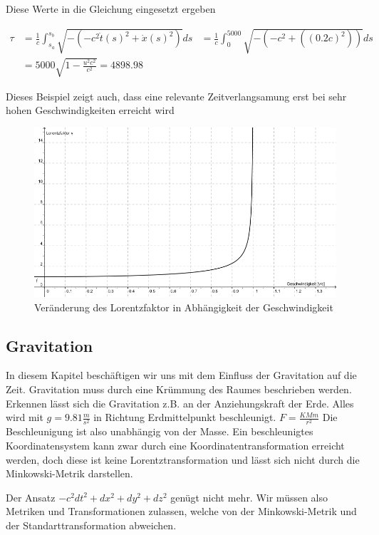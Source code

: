 \begin{refsection}
	
	Diese Werte in die Gleichung eingesetzt ergeben

\begin{align*}
    \tau
    &=
    \frac{1}{c}\int_{s_{a}}^{s_{b}}\sqrt{-(-c^2\dot{t}(s)^2+\dot{x}(s)^2)}ds
    &=
    \frac{1}{c}\int_{0}^{5000}\sqrt{-(-c^2+((0.2c)^2))}ds\\
    &=
    5000\sqrt{1-\frac{u^2 c^2}{c^2}} = 4898.98
\end{align*}

Dieses Beispiel zeigt auch, dass eine relevante Zeitverlangsamung erst bei sehr hohen Geschwindigkeiten erreicht wird

\begin{figure}
    \centering
    \includegraphics[width=\hsize]{zeitreisen/Lorentzfaktor.jpg}
    \caption{Ver\"anderung des Lorentzfaktor in Abh\"angigkeit der Geschwindigkeit%
        \label{skript:geodaten:fig:transport}}
\end{figure}

\subsection{Gravitation}

	In diesem Kapitel beschäftigen wir uns mit dem Einfluss der Gravitation auf die Zeit. Gravitation muss durch eine Krümmung des Raumes beschrieben werden. Erkennen lässt sich die Gravitation z.B. an der Anziehungskraft der Erde. Alles wird mit $g=9.81\frac{m}{s^2}$ in Richtung Erdmittelpunkt beschleunigt. $F=\frac{KMm}{r^2}$
	Die Beschleunigung ist also unabhängig von der Masse.
	Ein beschleunigtes Koordinatensystem kann zwar durch eine Koordinatentransformation erreicht werden, doch diese ist keine Lorentztransformation und lässt sich nicht durch die Minkowski-Metrik darstellen.
	
	Der Ansatz $ -c^2dt^2 + dx^2 + dy^2 + dz^2$ genügt nicht mehr. Wir müssen also Metriken und Transformationen zulassen, welche von der Minkowski-Metrik und der Standarttransformation abweichen.
	

\end{refsection}
